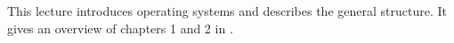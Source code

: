 This lecture introduces operating systems and describes the general structure.
It gives an overview of chapters 1 and 2 in 
\cite{Silberschatz2009osc,Silberschatz2013intl,Silberschatz2013osc}.
